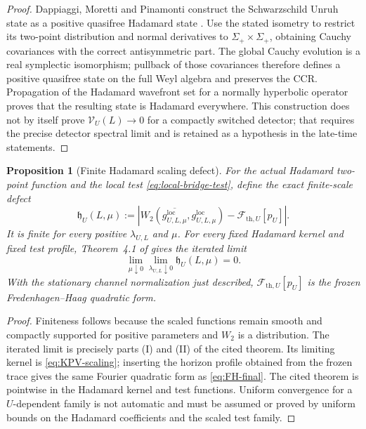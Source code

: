 \documentclass[11pt,a4paper]{article}
\newtheorem{proposition}[theorem]{Proposition}
\theoremstyle{definition}
\theoremstyle{remark}
\begin{document}
	\begin{proof}
		Dappiaggi, Moretti and Pinamonti construct the Schwarzschild Unruh state as a
		positive quasifree Hadamard state \cite{DappiaggiMorettiPinamonti2011}.
		Use the stated isometry to restrict its two-point distribution and normal
		derivatives to $\Sigma_+\times\Sigma_+$, obtaining Cauchy covariances
		with the correct antisymmetric part.  The global Cauchy evolution is a real
		symplectic isomorphism; pullback of those covariances therefore defines a
		positive quasifree state on the full Weyl algebra and preserves the CCR.
		Propagation of the Hadamard wavefront set for a normally hyperbolic operator
		proves that the resulting state is Hadamard everywhere.  This construction
		does not by itself prove $\mathcal V_U(L)\to0$ for a compactly switched
		detector; that requires the precise detector spectral limit and is retained
		as a hypothesis in the late-time statements.
	\end{proof}
	
	\begin{proposition}[Finite Hadamard scaling defect]
		\label{lem:finite-Hadamard}
		For the actual Hadamard two-point function and the local test
		\eqref{eq:local-bridge-test}, define the exact finite-scale defect
		\begin{equation}
			\mathfrak h_U(L,\mu):=
			\left|W_2(\overline{g^{\mathrm{loc}}_{U,L,\mu}},
			g^{\mathrm{loc}}_{U,L,\mu})
			-\mathcal F_{\mathrm{th},U}[p_U]\right|.
			\label{eq:Hadamard-modulus-definition}
		\end{equation}
		It is finite for every positive $\lambda_{U,L}$ and $\mu$.  For every fixed
		Hadamard kernel and fixed test profile, Theorem~4.1 of
		\cite{KurpiczPinamontiVerch2021} gives the iterated limit
		\begin{equation}
			\lim_{\mu\downarrow0}\lim_{\lambda_{U,L}\downarrow0}
			\mathfrak h_U(L,\mu)=0.
			\label{eq:finite-Hadamard-error}
		\end{equation}
		With the stationary channel normalization just described,
		$\mathcal F_{\mathrm{th},U}[p_U]$ is the frozen Fredenhagen--Haag quadratic
		form.
	\end{proposition}
	
	\begin{proof}
		Finiteness follows because the scaled functions remain smooth and compactly
		supported for positive parameters and $W_2$ is a distribution.  The iterated
		limit is precisely parts (I) and (II) of the cited theorem.  Its limiting
		kernel is \eqref{eq:KPV-scaling}; inserting the horizon profile obtained from
		the frozen trace gives the same Fourier quadratic form as
		\eqref{eq:FH-final}.  The cited theorem is pointwise in the Hadamard kernel
		and test functions.  Uniform convergence for a $U$-dependent family is not
		automatic and must be assumed or proved by uniform bounds on the Hadamard
		coefficients and the scaled test family.
	\end{proof}
	
\end{document}
